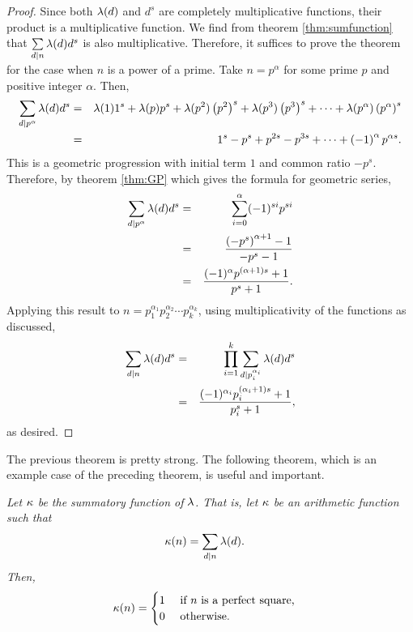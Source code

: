 \documentclass[12pt]{subfile}
\begin{document}
		\begin{proof}
			Since both $\lambda(d)$ and $d^s$ are completely multiplicative functions, their product is a multiplicative function. We find from theorem \eqref{thm:sumfunction} that $\sum\limits_{d|n} \lambda (d) d^s$ is also multiplicative. Therefore, it suffices to prove the theorem for the case when $n$ is a power of a prime. Take $n=p^\alpha$ for some prime $p$ and positive integer $\alpha$. Then,
				\begin{eqnarray*}
					\sum_{d|p^\alpha} \lambda (d) d^s &=& \lambda (1) 1^s + \lambda (p) p^s + \lambda (p^2) \left(p^2\right)^s +\lambda (p^3) \left(p^3\right)^s+ \cdots + \lambda (p^\alpha) \left(p^\alpha \right)^s\\
											 &=& 1^s - p^s + p^{2s} - p^{3s} +\cdots + \left(-1\right)^{\alpha} p^{\alpha s}.
				\end{eqnarray*}
			This is a geometric progression with initial term $1$ and common ratio $-p^s$. Therefore, by theorem \eqref{thm:GP} which gives the formula for geometric series,
				\begin{eqnarray*}
					\sum_{d|p^\alpha} \lambda (d) d^s &=& \sum_{i=0}^{\alpha} (-1)^{si}p^{si}\\
											 &= &\frac{\left(-p^s\right)^{\alpha + 1} -1}{-p^s -1}\\
											 &=& \frac{(-1)^\alpha p^{(\alpha + 1)s} + 1}{p^s + 1}.
				\end{eqnarray*}
			Applying this result to $n= p_1^{\alpha_1} p_2^{\alpha_2} \cdots p_k^{\alpha_k}$, using multiplicativity of the functions as discussed,
				\begin{eqnarray*}
					\sum_{d|n} \lambda (d) d^s  &=& \prod_{i=1}^{k}\sum_{d|p_i^{\alpha_i}} \lambda (d) d^s \\
										   &=& \frac{(-1)^{\alpha_i} p_i^{(\alpha_i+1)s} + 1}{p_i^s + 1},
				\end{eqnarray*}
			as desired.
		\end{proof}
		
	The previous theorem is pretty strong. The following theorem, which is an example case of the preceding theorem, is useful and important.
		
		\begin{theorem}\slshape \label{thm:liouville-sum-function}
			Let $\kappa$ be the summatory function of $\lambda $. That is, let $\kappa$ be an arithmetic function such that
				\begin{align*}
					\kappa (n) & = \sum_{d|n}\lambda (d).
				\end{align*}
			Then, 
				\begin{align*}
					\kappa(n) & =
						\begin{cases}
							1&\text{ if }n\text{ is a perfect square,}\\
							0&\text{ otherwise.}
						\end{cases}
				\end{align*}
		\end{theorem}
		
\end{document}
